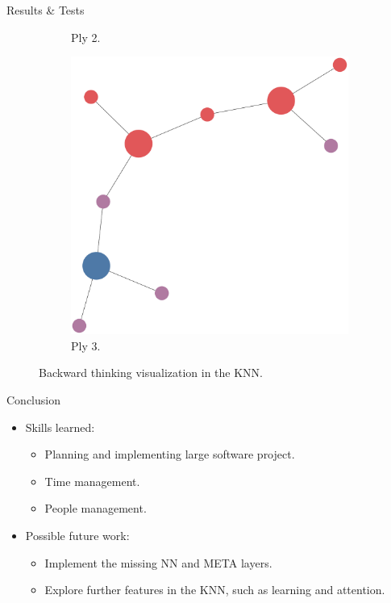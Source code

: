 \documentclass[final]{beamer} %
\begin{document}
\begin{frame}
\begin{columns}
\begin{column}{.33\textwidth}
{\begin{block}{Results \& Tests}
\begin{figure}[!htb]
\begin{subfigure}[!htb]{0.32\columnwidth}
							\caption{Ply 2.}
						\end{subfigure}
						\begin{subfigure}[!htb]{0.32\columnwidth}
							\centering
							\includegraphics[width=\columnwidth]{figures/knn_simple_backward_think_2.pdf}
							\caption{Ply 3.}
						\end{subfigure}
						\caption{Backward thinking visualization in the KNN.}
					\end{figure}
				\end{block}
				\begin{block}{Conclusion}
					\begin{itemize}
						\item Skills learned:
						\begin{itemize}
							\item Planning and implementing large software project.
							\item Time management.
							\item People management.
						\end{itemize}
					
						\item Possible future work:
						\begin{itemize}
							\item Implement the missing NN and META layers.
							\item Explore further features in the KNN, such as learning and attention.
						\end{itemize}
					\end{itemize}
				\end{block}
			}
			\end{column}
		\end{columns}
	\end{frame}
\end{document}
